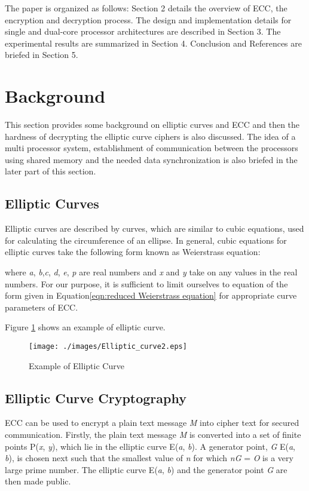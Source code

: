 \documentclass[preprint,12pt]{elsarticle}
\begin{document}
The paper is organized as follows: Section 2 details the overview of ECC, the encryption and decryption process. The design and implementation details for single and dual-core processor architectures are described in Section 3. The experimental results are summarized in Section 4. Conclusion and References are briefed in Section 5.



\section{Background}                                                                            
This section provides some background on elliptic curves and ECC and then the hardness of decrypting the elliptic curve ciphers is also discussed. The idea of a multi processor system, establishment of communication between the processors using shared memory and the needed data synchronization is also briefed in the later part of this section.
\subsection{Elliptic Curves}
Elliptic curves are described by curves, which are similar to cubic equations, used for calculating the circumference of an ellipse. In general, cubic equations for elliptic curves take the following form known as Weierstrass equation\cite{stalling}:

where \emph{a}, \emph{b},\emph{c}, \emph{d}, \emph{e}, \emph{p} are real numbers and \emph{x} and \emph{y} take on any values in the real numbers. For our purpose, it is sufficient to limit ourselves to equation of the form given in Equation\ref{eqn:reduced Weierstrass equation} for appropriate curve parameters of ECC.

 Figure \ref{fig:elliptic curve(a)} shows an example of elliptic curve.
\begin{figure}[htbp]
	\centering
		\texttt{[image: ./images/Elliptic\_curve2.eps]}
\caption[elliptic curve(a)]{Example of Elliptic Curve}
	\label{fig:elliptic curve(a)}
\end{figure}
 
\subsection{Elliptic Curve Cryptography}

ECC can be used to encrypt a plain text message \emph{M} into cipher text for secured communication. Firstly, the plain text message \emph{M} is converted into a set of finite points  P(\emph{x}, \emph{y}), which lie in the elliptic curve E(\emph{a}, \emph{b}). A generator point, \emph{G}  E(\emph{a}, \emph{b}), is chosen next such that the smallest value of \emph{n} for which \emph{n}\emph{G} = \emph{O} is a very large prime number. The elliptic curve E(\emph{a}, \emph{b}) and the generator point \emph{G} are then made public.
\end{document}
